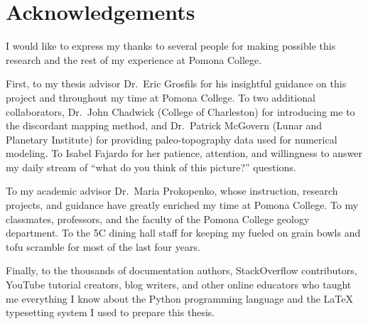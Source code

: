 \chapter*{Acknowledgements}

I would like to express my thanks to several people for making possible this research and the rest of my experience at Pomona College. 

First, to my thesis advisor Dr.\ Eric Grosfils for his insightful guidance on this project and throughout my time at Pomona College. To two additional collaborators, Dr.\ John Chadwick (College of Charleston) for introducing me to the discordant mapping method, and Dr.\ Patrick McGovern (Lunar and Planetary Institute) for providing paleo-topography data used for numerical modeling. To Isabel Fajardo for her patience, attention, and willingness to answer my daily stream of ``what do you think of this picture?'' questions.

To my academic advisor Dr.\ Maria Prokopenko, whose instruction, research projects, and guidance have greatly enriched my time at Pomona College. To my classmates, professors, and the faculty of the Pomona College geology department. To the 5C dining hall staff for keeping my fueled on grain bowls and tofu scramble for most of the last four years.

Finally, to the thousands of documentation authors, StackOverflow contributors, YouTube tutorial creators, blog writers, and other online educators who taught me everything I know about the Python programming language and the \LaTeX{} typesetting system I used to prepare this thesis.